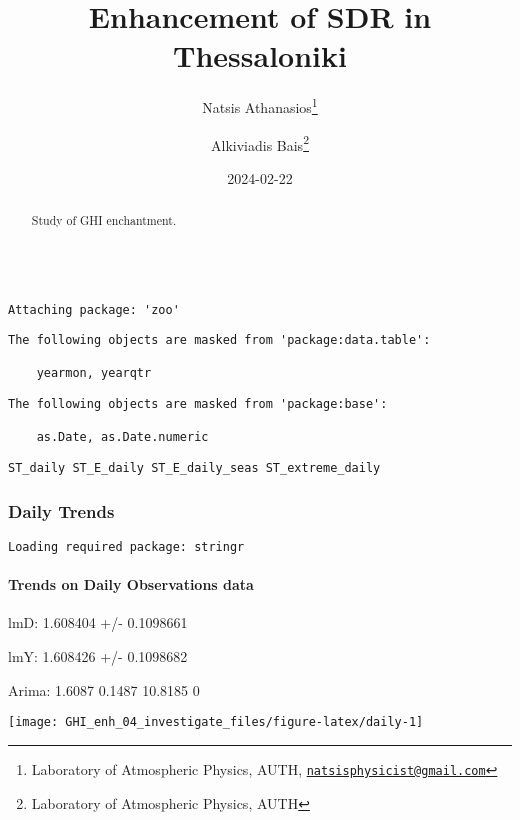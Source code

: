 \documentclass[
  10pt,
  a4paper,oneside]{article}
\title{Enhancement of SDR in Thessaloniki}
\author{Natsis Athanasios\footnote{Laboratory of Atmospheric Physics, AUTH, \href{mailto:natsisphysicist@gmail.com}{\nolinkurl{natsisphysicist@gmail.com}}} \and Alkiviadis Bais\footnote{Laboratory of Atmospheric Physics, AUTH}}
\date{2024-02-22}
\begin{document}
\maketitle
\begin{abstract}
Study of GHI enchantment.
\end{abstract}

{
\hypersetup{linkcolor=}
\setcounter{tocdepth}{4}
\tableofcontents
}
\begin{verbatim}

Attaching package: 'zoo'
\end{verbatim}

\begin{verbatim}
The following objects are masked from 'package:data.table':

    yearmon, yearqtr
\end{verbatim}

\begin{verbatim}
The following objects are masked from 'package:base':

    as.Date, as.Date.numeric
\end{verbatim}

\begin{verbatim}
ST_daily ST_E_daily ST_E_daily_seas ST_extreme_daily
\end{verbatim}

\newpage
\FloatBarrier

\hypertarget{daily-trends}{%
\subsubsection{Daily Trends}\label{daily-trends}}

\newpage

\begin{verbatim}
Loading required package: stringr
\end{verbatim}

\hypertarget{trends-on-daily-observations-data}{%
\paragraph{Trends on Daily Observations data}\label{trends-on-daily-observations-data}}

lmD: 1.608404 +/- 0.1098661

lmY: 1.608426 +/- 0.1098682

Arima: 1.6087 0.1487 10.8185 0

\begin{center}\texttt{[image: GHI\_enh\_04\_investigate\_files/figure-latex/daily-1]} \end{center}
\end{document}
